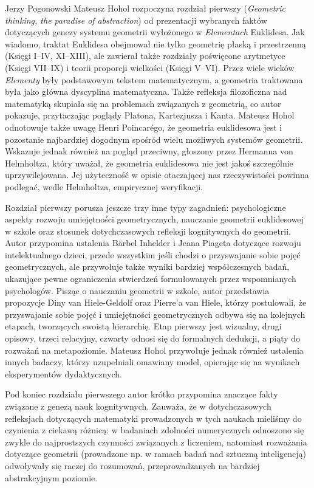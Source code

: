 \begin{newrevengenv}{Jerzy Pogonowski}
Mateusz Hohol rozpoczyna rozdział pierwszy ({\em Geometric
thinking, the paradise of abstraction}) od prezentacji wybranych
faktów dotyczących genezy systemu geometrii wyłożonego w {\em
Elementach} Euklidesa. Jak wiadomo, traktat Euklidesa obejmował
nie tylko geometrię płaską i przestrzenną (Księgi I--IV,
XI--XIII), ale zawierał także rozdziały poświęcone arytmetyce
(Księgi VII--IX) i teorii proporcji wielkości (Księgi V--VI).
Przez wiele wieków {\em Elementy} były podstawowym tekstem
matematycznym, a geometria traktowana była jako główna dyscyplina
matematyczna. Także refleksja filozoficzna nad matematyką skupiała
się na problemach związanych z geometrią, co autor pokazuje,
przytaczając poglądy Platona, Kartezjusza i Kanta. Mateusz Hohol
odnotowuje także uwagę Henri Poincar\'{e}go, że geometria
euklidesowa jest i pozostanie najbardziej dogodnym spośród wielu
możliwych systemów geometrii. Wskazuje jednak również na pogląd
przeciwny, głoszony przez Hermanna von Helmholtza, który uważał,
że geometria euklidesowa nie jest jakoś szczególnie
uprzywilejowana. Jej użyteczność w opisie otaczającej nas
rzeczywistości powinna podlegać, wedle Helmholtza, empirycznej
weryfikacji.

Rozdział pierwszy porusza jeszcze trzy inne typy zagadnień:
psychologiczne aspekty rozwoju umiejętności geometrycznych,
nauczanie geometrii euklidesowej w szkole oraz stosunek
dotychczasowych refleksji kognitywnych do geometrii. Autor
przypomina ustalenia B\"{a}rbel Inhelder i Jeana Piageta dotyczące
rozwoju intelektualnego dzieci, przede wszystkim jeśli chodzi o
przyswajanie sobie pojęć geometrycznych, ale przywołuje także
wyniki bardziej współczesnych badań, ukazujące pewne ograniczenia
stwierdzeń formułowanych przez wspomnianych psychologów. Pisząc o
nauczaniu geometrii w szkole, autor przedstawia propozycje Diny
van Hiele-Geldolf oraz Pierre'a van Hiele, którzy postulowali, że
przyswajanie sobie pojęć i umiejętności geometrycznych odbywa się
na kolejnych etapach, tworzących swoistą hierarchię. Etap pierwszy
jest wizualny, drugi opisowy, trzeci relacyjny, czwarty odnosi się
do formalnych dedukcji, a piąty do rozważań na metapoziomie.
Mateusz Hohol przywołuje jednak również ustalenia innych badaczy,
którzy uzupełniali omawiany model, opierając się na wynikach
eksperymentów dydaktycznych.

Pod koniec rozdziału pierwszego autor krótko przypomina znaczące
fakty związane z genezą nauk kognitywnych. Zauważa, że w
dotychczasowych refleksjach dotyczących matematyki prowadzonych w
tych naukach mieliśmy do czynienia z ciekawą różnicą: w badaniach
zdolności numerycznych odnoszono się zwykle do najprostszych
czynności związanych z liczeniem, natomiast rozważania dotyczące
geometrii (prowadzone np. w ramach badań nad sztuczną
inteligencją) odwoływały się raczej do rozumowań, przeprowadzanych
na bardziej abstrakcyjnym poziomie.


\end{newrevengenv}
